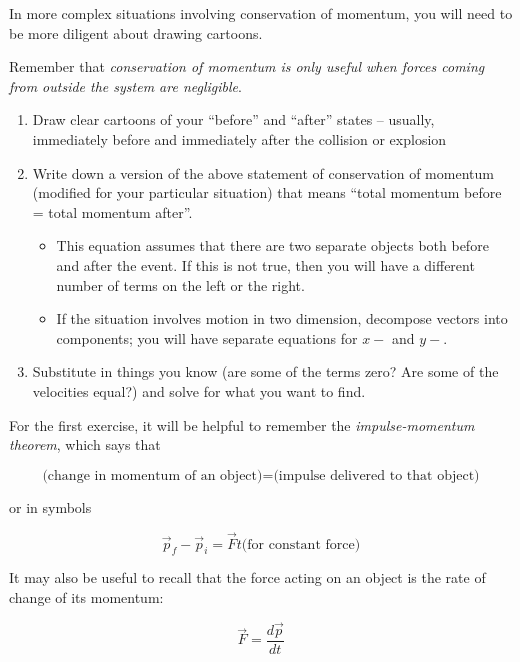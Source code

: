 \documentclass[12pt]{article}
\begin{document}
\Large
\centerline{}

\normalsize
\centerline{}

In more complex situations involving conservation of momentum, you will need to be more diligent about drawing cartoons.

Remember that {\it conservation of momentum is only useful when forces coming from outside the system are negligible}. 

\begin{enumerate}
	\item Draw clear cartoons of your ``before'' and ``after'' states -- usually, immediately before and immediately after the collision or explosion
	\item Write down a version of the above statement of conservation of momentum (modified for your particular situation) that means ``total momentum before = total momentum after''. 
	\begin{itemize}
		\item This equation assumes that there are two separate objects both before and after the event. If this is not true, then you will have a different number of terms on the left or the right.
		\item If the situation involves motion in two dimension, decompose vectors into components; you will have separate equations for $x-$ and $y-$.
	\end{itemize}
	\item Substitute in things you know (are some of the terms zero? Are some of the velocities equal?) and solve for what you want to find.
\end{enumerate}

For the first exercise, it will be helpful to remember the {\it impulse-momentum theorem}, which says that 

$$\text{(change in momentum of an object)} = \text{(impulse delivered to that object)}$$

or in symbols

$$\vec p_f - \vec p_i = \vec F t \text{(for constant force)}$$

It may also be useful to recall that the force acting on an object is the rate of change of its momentum:

$$\vec F = \frac{d\vec p}{dt}$$


\newpage
\end{document}
